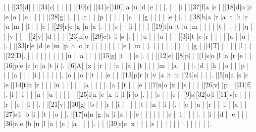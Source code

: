\documentclass[12pt]{article}
\begin{document}
\begin{Puzzle}{22}{24}
  |{}  |{}  |[35]d|{}  |{}  |[34]c|{}  |{}  |{}  |{}  |{}  |[10]r|{}  |[41]c|[40]l|a   |u   |d   |e   |{}  |{}  |.
  |{}  |{}  |i   |{}  |[37]f|a   |c   |{}  |[18]d|o   |c   |e   |o   |{}  |e   |{}  |{}  |{}  |{}  |[28]g|{}  |.
  |{}  |{}  |r   |{}  |{}  |p   |{}  |{}  |{}  |{}  |{}  |c   |{}  |{}  |g   |{}  |{}  |{}  |{}  |e   |{}  |.
  |{}  |[38]b|a   |r   |a   |t   |h   |r   |u   |m   |{}  |l   |{}  |{}  |e   |{}  |[29]r|e   |g   |n   |a   |.
  |{}  |{}  |s   |{}  |{}  |i   |{}  |{}  |{}  |{}  |[19]t|u   |t   |u   |m   |{}  |{}  |{}  |{}  |t   |{}  |.
  |{}  |{}  |q   |{}  |{}  |v   |{}  |{}  |{}  |[2]v|{}  |d   |{}  |{}  |{}  |[23]n|o   |[20]c|t   |i   |s   |.
  |{}  |{}  |u   |{}  |{}  |u   |{}  |{}  |{}  |[3]i|t   |e   |r   |{}  |{}  |{}  |{}  |a   |{}  |u   |{}  |.
  |{}  |[33]r|e   |d   |e   |m   |p   |t   |o   |r   |{}  |{}  |{}  |{}  |{}  |{}  |{}  |e   |{}  |m   |{}  |.
  |{}  |{}  |{}  |{}  |{}  |{}  |{}  |{}  |{}  |g   |{}  |[4]T|{}  |{}  |{}  |{}  |{}  |l   |{}  |{}  |[22]D|.
  |{}  |{}  |{}  |{}  |{}  |{}  |{}  |{}  |{}  |u   |{}  |a   |{}  |{}  |{}  |[15]g|{}  |i   |{}  |{}  |e   |.
  |{}  |{}  |[12]e|{}  |[8]p|{}  |{}  |[1]s|o   |l   |a   |r   |e   |{}  |[16]p|e   |c   |c   |a   |t   |i   |.
  |[6]A|{}  |x   |{}  |r   |{}  |{}  |u   |{}  |a   |{}  |t   |{}  |{}  |{}  |m   |{}  |a   |{}  |{}  |{}  |.
  |d   |{}  |h   |{}  |o   |{}  |{}  |p   |{}  |{}  |{}  |a   |{}  |{}  |{}  |i   |{}  |{}  |{}  |{}  |{}  |.
  |o   |{}  |o   |{}  |t   |{}  |{}  |e   |{}  |{}  |[13]p|r   |i   |v   |a   |t   |u   |[24]s|{}  |{}  |{}  |.
  |[5]n|a   |s   |c   |e   |[14]t|u   |r   |{}  |{}  |{}  |u   |{}  |{}  |{}  |{}  |{}  |a   |{}  |{}  |{}  |.
  |a   |{}  |t   |{}  |{}  |e   |{}  |[7]n|o   |x   |{}  |s   |{}  |{}  |{}  |[26]v|{}  |p   |{}  |[31]f|{}  |.
  |i   |{}  |i   |{}  |{}  |n   |{}  |u   |{}  |{}  |{}  |{}  |{}  |[25]i|n   |e   |x   |i   |l   |i   |o   |.
  |{}  |{}  |s   |{}  |{}  |e   |{}  |[9]s|[32]o|l   |[11]v|e   |{}  |{}  |{}  |r   |{}  |e   |{}  |l   |{}  |.
  |{}  |[21]v|{}  |[30]g|{}  |b   |{}  |{}  |r   |{}  |i   |{}  |{}  |{}  |{}  |t   |{}  |n   |{}  |i   |{}  |.
  |{}  |e   |{}  |a   |{}  |r   |{}  |{}  |i   |{}  |a   |{}  |[27]s|i   |b   |i   |{}  |t   |{}  |o   |{}  |.
  |[17]u|n   |g   |u   |l   |a   |{}  |{}  |e   |{}  |{}  |{}  |{}  |{}  |{}  |c   |{}  |i   |{}  |{}  |{}  |.
  |{}  |i   |{}  |d   |{}  |e   |{}  |{}  |[36]n|e   |b   |u   |l   |a   |{}  |e   |{}  |a   |{}  |{}  |{}  |.
  |{}  |{}  |[39]r|e   |x   |{}  |{}  |{}  |s   |{}  |{}  |{}  |{}  |{}  |{}  |{}  |{}  |{}  |{}  |{}  |{}  |.
\end{Puzzle}
\end{document}
